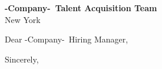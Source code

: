 \documentclass{letter}
\newcommand{\company}{-Company-}
\begin{document}
\begin{letter}{\textbf{\company\ Talent Acquisition Team} \\                
                New York }

\opening{Dear \company\ Hiring Manager,}


\closing{Sincerely,}

\end{letter}
\end{document}
